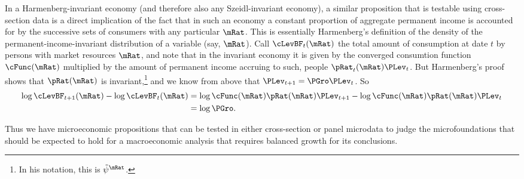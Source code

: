 \documentclass[BufferStockTheory]{subfiles}
\begin{document}
In a Harmenberg-invariant economy (and therefore also any Szeidl-invariant economy), a similar proposition that is testable using cross-section data is a direct implication of the fact that in such an economy a constant proportion of aggregate permanent income is accounted for by the successive sets of consumers with any particular $\mRat$.  This is essentially Harmenberg's definition of the density of the permanent-income-invariant distribution of a variable (say, $\mRat$).  Call $\cLevBF_{t}(\mRat)$ the total amount of consumption at date $t$ by persons with market resources $\mRat$, and note that in the invariant economy it is given by the converged consumtion function $\cFunc(\mRat)$ multiplied by the amount of permanent income accruing to such, people $\pRat_{t}(\mRat)\PLev_{t}$.  But Harmenberg's proof shows that $\pRat(\mRat)$ is invariant,\footnote{In his notation, this is $\tilde{\psi}^{\mRat}$.} and we know from above that $\PLev_{t+1} = \PGro \PLev_{t}$.  So 
\begin{align}
  \log \cLevBF_{t+1}(\mRat) - \log \cLevBF_{t}(\mRat) &  \notag 
    = \log \cFunc(\mRat) \pRat(\mRat)\PLev_{t+1} - \log \cFunc(\mRat)\pRat(\mRat)\PLev_{t} \\
  & = \log \PGro .
\end{align}

Thus we have microeconomic propositions that can be tested in either cross-section or panel microdata to judge the microfoundations that should be expected to hold for a macroeconomic analysis that requires balanced growth for its conclusions.
\end{document}
